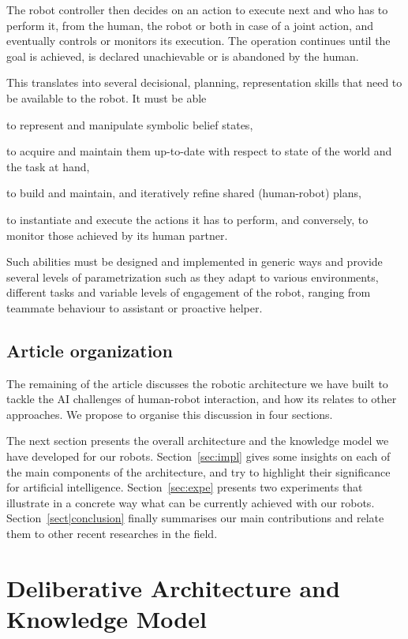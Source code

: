 \documentclass[preprint,3p,times]{elsarticle}
\begin{document}
The robot controller then decides on an action to execute next and who has to
perform it, from the human, the robot or both in case of a joint action, and
eventually controls or monitors its execution. The operation continues until the
goal is achieved, is declared unachievable or is abandoned by the human.

\begin{inparaenum}
This translates into several decisional, planning, representation skills that
need to be available to the robot. It must be able \item to represent and
manipulate symbolic belief states, \item to acquire and maintain them up-to-date
with respect to state of the world and the task at hand, \item to build and
maintain, and iteratively refine shared (human-robot) plans, \item to
instantiate and execute the actions it has to perform, and conversely,
to monitor those achieved by its human partner.
\end{inparaenum}

Such abilities must be designed and implemented in generic ways and
provide several levels of parametrization such as they adapt to
various environments, different tasks and variable levels of engagement of the
robot, ranging from teammate behaviour to assistant or proactive helper.

\subsection{Article organization}

The remaining of the article discusses the robotic architecture we have built to
tackle the AI challenges of human-robot interaction, and how its relates to
other approaches. We propose to organise this discussion in four sections.

The next section presents the overall architecture and the knowledge model we
have developed for our robots. Section~\ref{sec:impl} gives some insights on
each of the main components of the architecture, and try to highlight their
significance for artificial intelligence. Section~\ref{sec:expe} presents two
experiments that illustrate in a concrete way what can be currently achieved
with our robots.  Section~\ref{sect|conclusion} finally summarises our main
contributions and relate them to other recent researches in the field.

\section{Deliberative Architecture and Knowledge Model}
\end{document}
